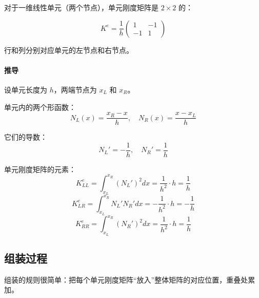 对于一维线性单元（两个节点），单元刚度矩阵是 $2 \times 2$ 的：

\begin{keyformula}[title=一维线性单元刚度矩阵]
\begin{equation}
K^e = \frac{1}{h}
\begin{pmatrix}
1 & -1 \\
-1 & 1
\end{pmatrix}
\end{equation}

行和列分别对应单元的左节点和右节点。
\end{keyformula}

\paragraph{推导}

设单元长度为 $h$，两端节点为 $x_L$ 和 $x_R$。

单元内的两个形函数：
\[
N_L(x) = \frac{x_R - x}{h}, \quad N_R(x) = \frac{x - x_L}{h}
\]

它们的导数：
\[
N_L' = -\frac{1}{h}, \quad N_R' = \frac{1}{h}
\]

单元刚度矩阵的元素：
\[
K^e_{LL} = \int_{x_L}^{x_R} (N_L')^2 dx = \frac{1}{h^2} \cdot h = \frac{1}{h}
\]
\[
K^e_{LR} = \int_{x_L}^{x_R} N_L' N_R' dx = -\frac{1}{h^2} \cdot h = -\frac{1}{h}
\]
\[
K^e_{RR} = \int_{x_L}^{x_R} (N_R')^2 dx = \frac{1}{h^2} \cdot h = \frac{1}{h}
\]

\subsection{组装过程}

组装的规则很简单：把每个单元刚度矩阵“放入”整体矩阵的对应位置，重叠处累加。

